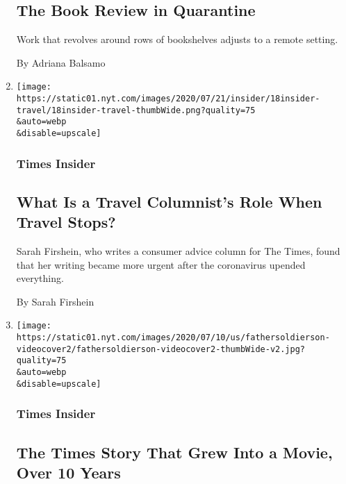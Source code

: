 \begin{enumerate}
  \hypertarget{the-book-review-in-quarantine}{%
  \subsection{The Book Review in
  Quarantine}\label{the-book-review-in-quarantine}}

  Work that revolves around rows of bookshelves adjusts to a remote
  setting.

  By Adriana Balsamo
\item
  \href{/2020/07/18/insider/travel-writing-pandemic.html}{}

  \texttt{[image: https://static01.nyt.com/images/2020/07/21/insider/18insider-travel/18insider-travel-thumbWide.png?quality=75\\\&auto=webp\\\&disable=upscale]}

  \hypertarget{times-insider-5}{%
  \subsubsection{Times Insider}\label{times-insider-5}}

  \hypertarget{what-is-a-travel-columnists-role-when-travel-stops}{%
  \subsection{What Is a Travel Columnist's Role When Travel
  Stops?}\label{what-is-a-travel-columnists-role-when-travel-stops}}

  Sarah Firshein, who writes a consumer advice column for The Times,
  found that her writing became more urgent after the coronavirus
  upended everything.

  By Sarah Firshein
\item
  \href{/2020/07/17/insider/father-soldier-son.html}{}

  \texttt{[image: https://static01.nyt.com/images/2020/07/10/us/fathersoldierson-videocover2/fathersoldierson-videocover2-thumbWide-v2.jpg?quality=75\\\&auto=webp\\\&disable=upscale]}

  \hypertarget{times-insider-6}{%
  \subsubsection{Times Insider}\label{times-insider-6}}

  \hypertarget{the-times-story-that-grew-into-a-movie-over-10-years}{%
  \subsection{The Times Story That Grew Into a Movie, Over 10
  Years}\label{the-times-story-that-grew-into-a-movie-over-10-years}}


\end{enumerate}
